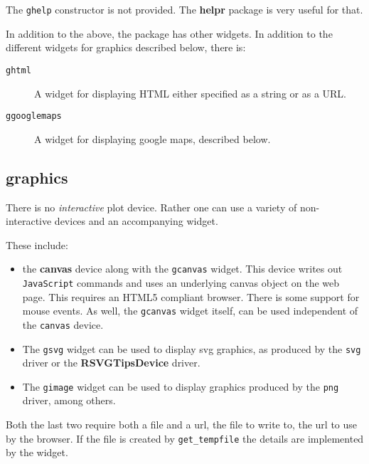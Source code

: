 \documentclass[12pt]{article}
\newcommand{\pkg}[1]{\textbf{#1}}
\newcommand{\code}[1]{\texttt{#1}}
\newcommand{\proglang}[1]{\code{#1}}
\newcommand{\javascript}{\proglang{JavaScript}}
\begin{document}
The \code{ghelp} constructor is not provided. The \pkg{helpr} package
is very useful for that.

In addition to the above, the package has other widgets. In addition
to the different widgets for graphics described below, there is:
\begin{description}
\item[\code{ghtml}] A widget for displaying HTML either specified as a
  string or as a URL.
\item[\code{ggooglemaps}] A widget for displaying google maps,
  described below.
\end{description}




\subsection{graphics}
\label{sec:graphics}

There is no \textit{interactive} plot device. Rather one can use a
variety of non-interactive devices and an accompanying widget.

These include:
\begin{itemize}
\item the \pkg{canvas} device along with the \code{gcanvas}
  widget. This device writes out \javascript{} commands and uses an
  underlying canvas object on the web page. This requires an HTML5
  compliant browser. There is some support for mouse events. As well,
  the \code{gcanvas} widget itself, can be used independent of the
  \code{canvas} device.
\item The \code{gsvg} widget can be used to display svg graphics, as
  produced by the \code{svg} driver or the \pkg{RSVGTipsDevice}
  driver.
\item The \code{gimage} widget can be used to display graphics
  produced by the \code{png} driver, among others.
\end{itemize}

Both the last two require both a file and a url, the file to write to,
the url to use by the browser. If the file is created by
\code{get\_tempfile} the details are implemented by the widget.
\end{document}
